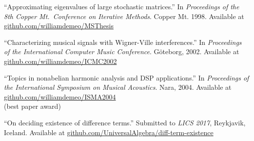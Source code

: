 \documentclass{article}
\begin{document}
\begin{thebibliography}{10}
       
  \newblock ``Approximating eigenvalues of large stochastic matrices.''
  \newblock In \emph{Proceedings of the 8th Copper Mt.~Conference on Iterative Methods}. Copper Mt. 1998. %
  \newblock Available at
  \href{https://github.com/williamdemeo/MSThesis}
       {{\small github.com/williamdemeo/MSThesis}}

  \newblock ``Characterizing musical signals with {W}igner-{V}ille interferences.''
  \newblock In {\em Proceedings of the International Computer Music Conference}. G\"{o}teborg, 2002.  %
  \newblock Available at
  \href{https://github.com/williamdemeo/ICMC2002}
       {{\small github.com/williamdemeo/ICMC2002}}
 
  \newblock ``Topics in nonabelian harmonic analysis and {DSP} applications.''
  \newblock In {\em Proceedings of the International Symposium on Musical Acoustics}. Nara,  2004.  %
  \newblock Available at
  \href{https://github.com/williamdemeo/ISMA2004}
       {{\small github.com/williamdemeo/ISMA2004}}\\ (best paper award)
  \newblock  

  \newblock ``On deciding existence of difference terms.''
  \newblock Submitted to \emph{LICS 2017}, Reykjavik, Iceland.
  \newblock Available at
  \href{https://github.com/UniversalAlgebra/diff-term-existence/tree/master/LICS}
       {{\small github.com/UniversalAlgebra/diff-term-existence}}

\end{thebibliography}


\renewcommand{\refname}{\normalsize In Preparation}
  
\end{document}

